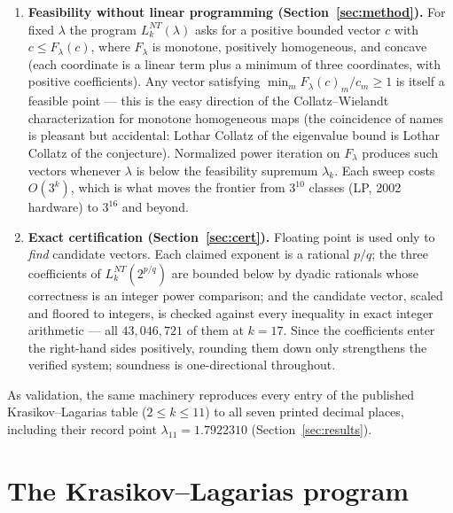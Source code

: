 \documentclass[11pt]{article}
\begin{document}
\begin{enumerate}
\item \textbf{Feasibility without linear programming
(Section~\ref{sec:method}).} For fixed $\lambda$ the program
$L_k^{NT}(\lambda)$ asks for a positive bounded vector $c$ with
$c \le F_\lambda(c)$, where $F_\lambda$ is monotone, positively
homogeneous, and concave (each coordinate is a linear term plus a
minimum of three coordinates, with positive coefficients). Any vector
satisfying $\min_m F_\lambda(c)_m / c_m \ge 1$ is itself a feasible
point --- this is the easy direction of the Collatz--Wielandt
characterization for monotone homogeneous maps (the coincidence of
names is pleasant but accidental: Lothar Collatz of the eigenvalue
bound is Lothar Collatz of the conjecture). Normalized power iteration
on $F_\lambda$ produces such vectors whenever $\lambda$ is below the
feasibility supremum $\lambda_k$. Each sweep costs $O(3^k)$, which is
what moves the frontier from $3^{10}$ classes (LP, 2002 hardware) to
$3^{16}$ and beyond.
\item \textbf{Exact certification (Section~\ref{sec:cert}).} Floating
point is used only to \emph{find} candidate vectors. Each claimed
exponent is a rational $p/q$; the three coefficients of
$L_k^{NT}(2^{p/q})$ are bounded below by dyadic rationals whose
correctness is an integer power comparison; and the candidate vector,
scaled and floored to integers, is checked against every inequality in
exact integer arithmetic --- all $43{,}046{,}721$ of them at $k = 17$.
Since the coefficients enter the right-hand sides positively, rounding
them down only strengthens the verified system; soundness is
one-directional throughout.
\end{enumerate}

As validation, the same machinery reproduces every entry of the
published Krasikov--Lagarias table ($2 \le k \le 11$) to all seven
printed decimal places, including their record point
$\lambda_{11} = 1.7922310$ (Section~\ref{sec:results}).

\section{The Krasikov--Lagarias program}\label{sec:kl}
\end{document}
